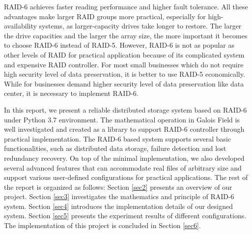 \documentclass[journal]{IEEEtran}
\begin{document}
RAID-6 achieves faster reading performance and higher fault tolerance. All these advantages make larger RAID groups more practical, especially for high-availability systems, as larger-capacity drives take longer to restore. The larger the drive capacities and the larger the array size, the more important it becomes to choose RAID-6 instead of RAID-5. However, RAID-6 is not as popular as other levels of RAID for practical application because of its complicated system and expensive RAID controller. For most small businesses which do not require high security level of data preservation, it is better to use RAID-5 economically. While for businesses demand higher security level of data preservation like data center, it is necessary to implement RAID-6.

In this report, we present a reliable distributed storage system based on RAID-6 under Python 3.7 environment. The mathematical operation in Galois Field is well investigated and created as a library to support RAID-6 controller through practical implementation. The RAID-6 based system supports several basic functionalities, such as distributed data storage, failure detection and lost redundancy recovery. On top of the minimal implementation, we also developed several advanced features that can accommodate real files of arbitrary size and support various user-defined configurations for practical applications. The rest of the report is organized as follows: Section \ref{sec2} presents an overview of our project. Section \ref{sec3} investigates the mathematics and principle of RAID-6 system. Section \ref{sec4} introduces the implementation details of our designed system. Section \ref{sec5} presents the experiment results of different configurations. The implementation of this project is concluded in Section \ref{sec6}.
\end{document}

